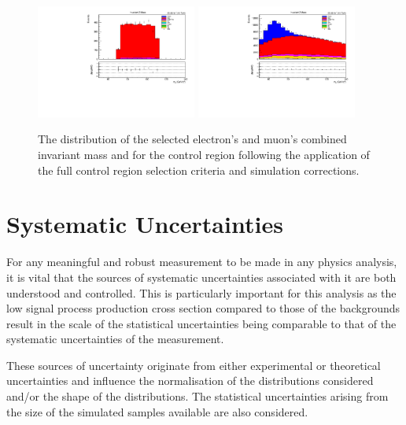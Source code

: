 \begin{figure}[tbp]
\centering
\includegraphics[width=0.47\textwidth]{figs/background-estimation/plots/unblinded/ttbar_control/zPairMass_wMass.pdf}
\includegraphics[width=0.47\textwidth]{figs/background-estimation/plots/unblinded/ttbar_control/zPairPt_wMass.pdf}
\caption{
The distribution of the selected electron's and muon's combined invariant mass and \pt for the \ttbar control region following the application of the full control region selection criteria and simulation corrections.
}
\label{fig:ttbarCR_leptons}
\end{figure}


\section{Systematic Uncertainties}\label{sec:systematics}
For any meaningful and robust measurement to be made in any physics analysis, it is vital that the sources of systematic uncertainties associated with it are both understood and controlled.
This is particularly important for this analysis as the low signal process production cross section compared to those of the backgrounds result in the scale of the statistical uncertainties being comparable to that of the systematic uncertainties of the measurement.

These sources of uncertainty originate from either experimental or theoretical uncertainties and influence the normalisation of the distributions considered and/or the shape of the distributions.
The statistical uncertainties arising from the size of the simulated samples available are also considered.

